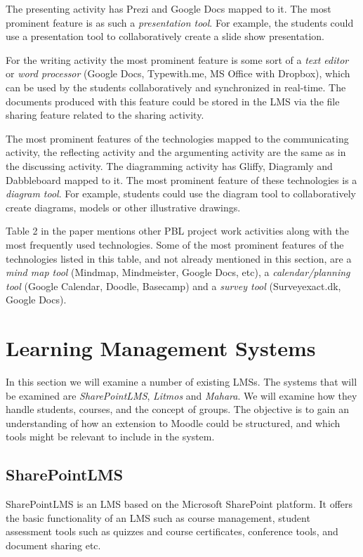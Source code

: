 The presenting activity has Prezi and Google Docs mapped to it. The most prominent feature is as such a \textit{presentation tool}.
For example, the students could use a presentation tool to collaboratively create a slide show presentation.

For the writing activity the most prominent feature is some sort of a \textit{text editor} or \textit{word processor} (Google Docs, Typewith.me, MS Office with Dropbox), which can be used by the students collaboratively and synchronized in real-time.
The documents produced with this feature could be stored in the LMS via the file sharing feature related to the sharing activity.

The most prominent features of the technologies mapped to the communicating activity, the reflecting activity and the argumenting activity are the same as in the discussing activity.
The diagramming activity has Gliffy, Diagramly and Dabbleboard mapped to it.
The most prominent feature of these technologies is a \textit{diagram tool}.
For example, students could use the diagram tool to collaboratively create diagrams, models or other illustrative drawings.

Table 2 in the paper mentions other PBL project work activities along with the most frequently used technologies.
Some of the most prominent features of the technologies listed in this table, and not already mentioned in this section, are a \textit{mind map tool} (Mindmap, Mindmeister, Google Docs, etc), a \textit{calendar/planning tool} (Google Calendar, Doodle, Basecamp) and a \textit{survey tool} (Surveyexact.dk, Google Docs).

\section{Learning Management Systems}\label{sec:LMS}
In this section we will examine a number of existing LMSs.
The systems that will be examined are \emph{SharePointLMS}, \emph{Litmos} and \emph{Mahara}.
We will examine how they handle students, courses, and the concept of groups.
The objective is to gain an understanding of how an extension to Moodle could be structured, and which tools might be relevant to include in the system.

\subsection{SharePointLMS}
SharePointLMS \citep{sharepointlms} is an LMS based on the Microsoft SharePoint platform. 
It offers the basic functionality of an LMS such as course management, student assessment tools such as quizzes and course certificates, conference tools, and document sharing etc.

